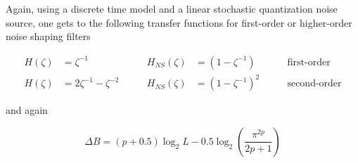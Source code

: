 Again, using a discrete time model and a linear stochastic quantization
noise source, one gets to the following transfer functions for first-order
or higher-order noise shaping filters

\begin{align*}
	H(\zeta) &= \zeta^{-1} \qquad &
	H_{NS}(\zeta) &= (1-\zeta^{-1}) \qquad
	& \text{first-order} \\
	H(\zeta) &= 2 \zeta^{-1} - \zeta^{-2} \qquad &
	H_{NS}(\zeta) &= (1-\zeta^{-1})^2 \qquad
	& \text{second-order}
\end{align*}

and again

\begin{equation*}
	\Delta B = (p+0.5) \log_2 L - 0.5 \log_2\left(\frac{\pi^{2p}}{2p+1}\right)
\end{equation*}
